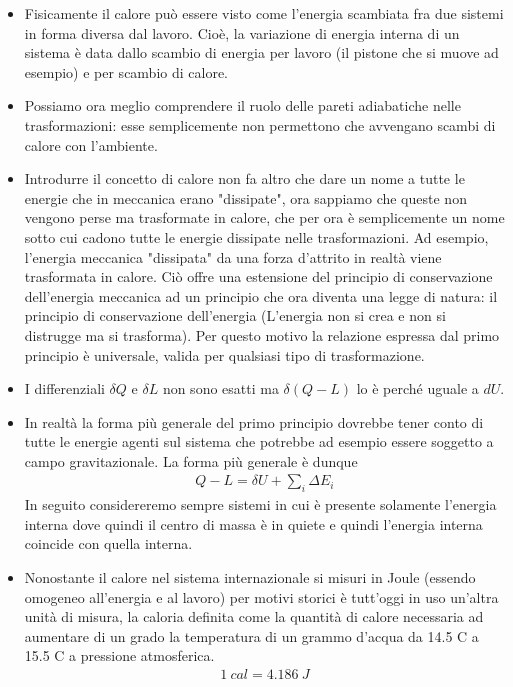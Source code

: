 \documentclass[10pt,a4paper]{article}
\begin{document}
\begin{itemize}
\item Fisicamente il calore può essere visto come l'energia scambiata fra due sistemi in forma diversa dal lavoro. Cioè, la variazione di energia interna di un sistema è data dallo scambio di energia per lavoro (il pistone che si muove ad esempio)  e per scambio di calore.
\item Possiamo ora meglio comprendere il ruolo delle pareti adiabatiche nelle trasformazioni: esse semplicemente non permettono che avvengano scambi di calore con l'ambiente.
\item Introdurre il concetto di calore non fa altro che dare un nome a tutte le energie che in meccanica erano "dissipate", ora sappiamo che queste non vengono perse ma trasformate in calore, che per ora è semplicemente un nome sotto cui cadono tutte le energie dissipate nelle trasformazioni. Ad esempio, l'energia meccanica "dissipata" da una forza d'attrito in realtà viene trasformata in calore. Ciò offre una estensione del principio di conservazione dell'energia meccanica ad un principio che ora diventa una legge di natura: il principio di conservazione dell'energia (L'energia non si crea e non si distrugge ma si trasforma). Per questo motivo la relazione espressa dal primo principio è universale, valida per qualsiasi tipo di trasformazione. 
\item I differenziali $\delta Q$ e $\delta L$ non sono esatti ma $\delta(Q-L)$ lo è perché uguale a $dU$.
\item In realtà la forma più generale del primo principio dovrebbe tener conto di tutte le energie agenti sul sistema che potrebbe ad esempio essere soggetto a campo gravitazionale. La forma più generale è dunque
\begin{align*} 
	Q-L = \delta U + \sum_i \Delta E_i
\end{align*} 
In seguito considereremo sempre sistemi in cui è presente solamente l'energia interna dove quindi il centro di massa è in quiete e quindi l'energia interna coincide con quella interna. 
\item Nonostante il calore nel sistema internazionale si misuri in Joule (essendo omogeneo all'energia e al lavoro) per motivi storici è tutt'oggi in uso un'altra unità di misura, la caloria definita come la quantità di calore necessaria ad aumentare di un grado la temperatura di un grammo d'acqua da 14.5 C a 15.5 C a pressione atmosferica. 
\begin{align*} 
	1\ cal = 4.186\ J
\end{align*} 

\end{itemize}
\end{document}
